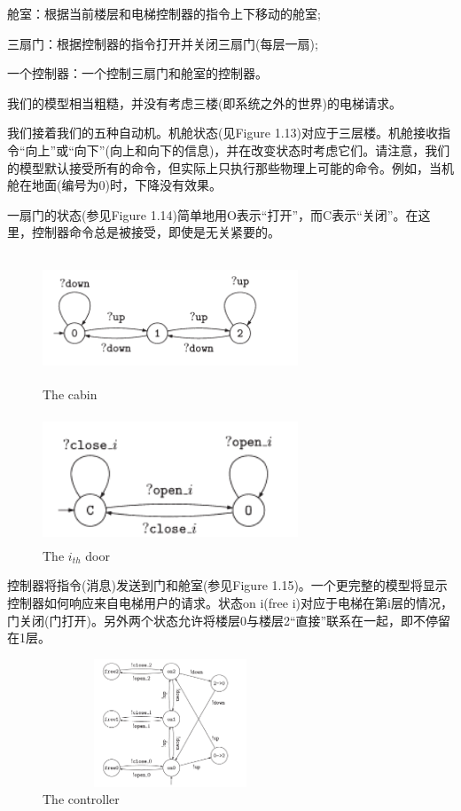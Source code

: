 \documentclass{book}
\begin{document}
    舱室：根据当前楼层和电梯控制器的指令上下移动的舱室;

    三扇门：根据控制器的指令打开并关闭三扇门(每层一扇);

    一个控制器：一个控制三扇门和舱室的控制器。

    我们的模型相当粗糙，并没有考虑三楼(即系统之外的世界)的电梯请求。

    我们接着我们的五种自动机。机舱状态(见Figure 1.13)对应于三层楼。机舱接收指令“向上”或“向下”(向上和向下的信息)，并在改变状态时考虑它们。请注意，我们的模型默认接受所有的命令，但实际上只执行那些物理上可能的命令。例如，当机舱在地面(编号为0)时，下降没有效果。

    一扇门的状态(参见Figure 1.14)简单地用O表示“打开”，而C表示“关闭”。在这里，控制器命令总是被接受，即使是无关紧要的。
    \begin{figure}
    \centering
    \includegraphics[height=1.5in,width=3.0in]{1_13.png}
    \caption{The cabin}
    \end{figure}
    \begin{figure}
    \centering
    \includegraphics[height=1.5in,width=3.0in]{1_14.png}
    \caption{The $i_{th}$ door}
    \end{figure}

    控制器将指令(消息)发送到门和舱室(参见Figure 1.15)。一个更完整的模型将显示控制器如何响应来自电梯用户的请求。状态on i(free i)对应于电梯在第i层的情况，门关闭(门打开)。另外两个状态允许将楼层0与楼层2“直接”联系在一起，即不停留在1层。
    \begin{figure}
    \centering
    \includegraphics[height=1.5in,width=3.0in]{1_15.png}
    \caption{The controller}
    \end{figure}
\end{document}
